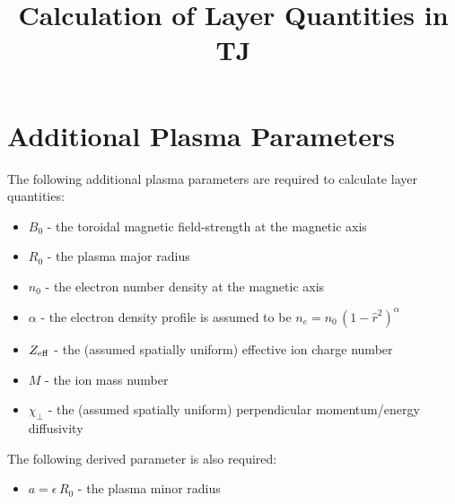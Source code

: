 \documentclass[12pt,prb,aps,notitlepage]{revtex4-1}
\begin{document}
\title{Calculation of Layer Quantities in TJ}
\maketitle

\section{Additional Plasma Parameters}
The following additional plasma parameters are required to calculate layer quantities:
\begin{itemize}
\item $B_0$ - the toroidal magnetic field-strength at the magnetic axis
\item $R_0$ - the plasma major radius
\item $n_0$ - the  electron number density at the magnetic axis
\item $\alpha$ - the electron density profile is assumed to be $n_e=n_0\,(1-\hat{r}^2)^\alpha$
\item $Z_{\rm eff}$  - the (assumed spatially uniform) effective ion charge number
\item $M$ - the ion mass number
\item $\chi_\perp$ - the (assumed spatially uniform) perpendicular momentum/energy diffusivity
\end{itemize}
The following derived parameter is also required:
\begin{itemize}
\item $a=\epsilon\,R_0$ - the plasma minor radius
\end{itemize}
\end{document}
